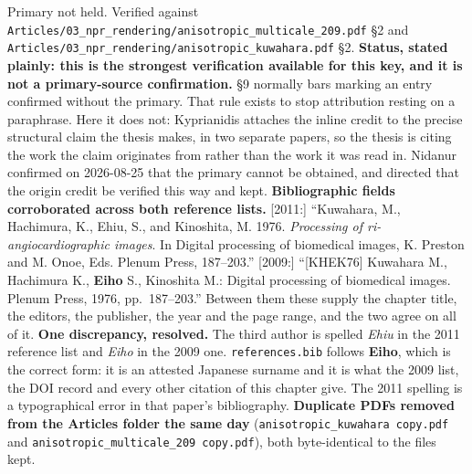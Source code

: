 \documentclass[11pt, a4paper]{article}
\begin{document}
\begin{Form}
  {Primary not held. Verified against \texttt{\footnotesize Articles/03\_npr\_rendering/anisotropic\_multicale\_209.pdf} \S2 and \texttt{\footnotesize Articles/03\_npr\_rendering/anisotropic\_kuwahara.pdf} \S2. \textbf{Status, stated plainly: this is the strongest verification available for this key, and it is not a primary-source confirmation.} \S9 normally bars marking an entry confirmed without the primary. That rule exists to stop attribution resting on a paraphrase. Here it does not: Kyprianidis attaches the inline credit to the precise structural claim the thesis makes, in two separate papers, so the thesis is citing the work the claim originates from rather than the work it was read in. Nidanur confirmed on 2026-08-25 that the primary cannot be obtained, and directed that the origin credit be verified this way and kept. \textbf{Bibliographic fields corroborated across both reference lists.} [2011:] ``Kuwahara, M., Hachimura, K., Ehiu, S., and Kinoshita, M. 1976. \emph{Processing of ri-angiocardiographic images}. In Digital processing of biomedical images, K. Preston and M. Onoe, Eds. Plenum Press, 187--203.'' [2009:] ``[KHEK76] Kuwahara M., Hachimura K., \textbf{Eiho} S., Kinoshita M.: Digital processing of biomedical images. Plenum Press, 1976, pp.~187--203.'' Between them these supply the chapter title, the editors, the publisher, the year and the page range, and the two agree on all of it. \textbf{One discrepancy, resolved.} The third author is spelled \emph{Ehiu} in the 2011 reference list and \emph{Eiho} in the 2009 one. \texttt{references.bib} follows \textbf{Eiho}, which is the correct form: it is an attested Japanese surname and it is what the 2009 list, the DOI record and every other citation of this chapter give. The 2011 spelling is a typographical error in that paper's bibliography. \textbf{Duplicate PDFs removed from the Articles folder the same day} (\texttt{anisotropic\_kuwahara copy.pdf} and \texttt{anisotropic\_multicale\_209 copy.pdf}), both byte-identical to the files kept.}


\end{Form}
\end{document}
